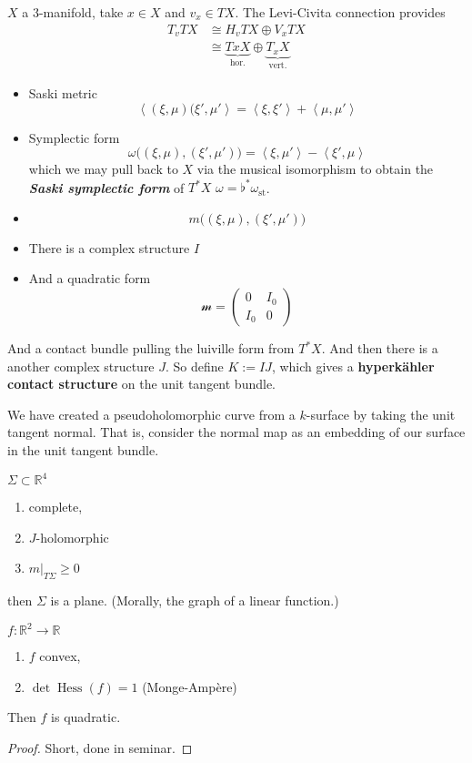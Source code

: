 $X$ a 3-manifold, take $x \in X$ and $v_x \in TX$. The Levi-Civita connection provides
\begin{align*}
T_vTX&\cong H_vTX\oplus V_xTX\\&\cong\underbrace{TxX}_{\text{hor.} }\oplus \underbrace{T_xX}_{\text{vert.} }
\end{align*}
\begin{itemize}
	\item Saski metric \[\left<(\xi,\mu)(\xi',\mu'\right>=\left<\xi,\xi'\right>+\left<\mu,\mu'\right>\]
	\item Symplectic form
		\[\omega\Big((\xi,\mu),(\xi',\mu')\Big)=\left<\xi,\mu'\right>-\left<\xi',\mu\right>\]
		which we may pull back to $X$ via the musical isomorphism to obtain the \textit{\textbf{Saski symplectic form}} of  $T^*X$ $\omega=\flat^*\omega_{\operatorname{st}}$.
\item \[m\Big((\xi,\mu),(\xi',\mu')\Big)\]

	\item There is a complex structure $I$
	
	\item And a quadratic form
	\[\mathcal{m}=\begin{pmatrix}0&I_0\\ I_0&0\end{pmatrix}\]
\end{itemize}
And a contact bundle pulling the luiville form from $T^*X$. And then there is a another complex structure $J$. So define $K:=I J$, which gives a \textbf{hyperkähler contact structure} on the unit tangent bundle. 

\begin{upshot}\leavevmode
	We have created a pseudoholomorphic curve from a $k$-surface by taking the unit tangent normal. That is, consider the normal map as an embedding of our surface in the unit tangent bundle.
\end{upshot}

\begin{thm}[Jurgens]\leavevmode
	$\Sigma\subset\mathbb{R}^4$
	\begin{enumerate}[label=(\roman*)]
	\item complete,
	\item $J$-holomorphic
\item $m|_{T\Sigma}\geq 0$
\end{enumerate}
then $\Sigma$ is a plane. (Morally, the graph of a linear function.)
\end{thm}

\begin{thm}\leavevmode
$f:\mathbb{R}^2\to\mathbb{R}$ 
\begin{enumerate}[label=(\roman*)]
\item $f$ convex,
\item $\det\operatorname{Hess}(f)=1$ (Monge-Ampère)
\end{enumerate}
Then $f$ is quadratic.

\begin{proof}\leavevmode
Short, done in seminar.
\end{proof}
\end{thm}

